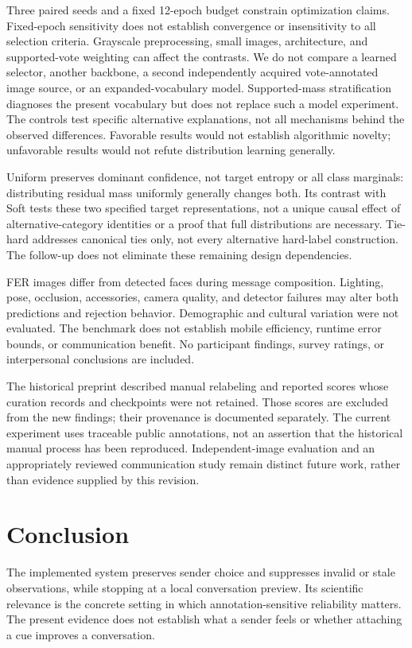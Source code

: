\documentclass[pdflatex,sn-mathphys-num]{sn-jnl}
\begin{document}
Three paired seeds and a fixed 12-epoch budget constrain optimization claims. Fixed-epoch sensitivity does not establish convergence or insensitivity to all selection criteria. Grayscale preprocessing, small images, architecture, and supported-vote weighting can affect the contrasts. We do not compare a learned selector, another backbone, a second independently acquired vote-annotated image source, or an expanded-vocabulary model. Supported-mass stratification diagnoses the present vocabulary but does not replace such a model experiment. The controls test specific alternative explanations, not all mechanisms behind the observed differences. Favorable results would not establish algorithmic novelty; unfavorable results would not refute distribution learning generally.

Uniform preserves dominant confidence, not target entropy or all class marginals: distributing residual mass uniformly generally changes both. Its contrast with Soft tests these two specified target representations, not a unique causal effect of alternative-category identities or a proof that full distributions are necessary. Tie-hard addresses canonical ties only, not every alternative hard-label construction. The follow-up does not eliminate these remaining design dependencies.

FER images differ from detected faces during message composition. Lighting, pose, occlusion, accessories, camera quality, and detector failures may alter both predictions and rejection behavior. Demographic and cultural variation were not evaluated. The benchmark does not establish mobile efficiency, runtime error bounds, or communication benefit. No participant findings, survey ratings, or interpersonal conclusions are included.

The historical preprint described manual relabeling and reported scores whose curation records and checkpoints were not retained. Those scores are excluded from the new findings; their provenance is documented separately. The current experiment uses traceable public annotations, not an assertion that the historical manual process has been reproduced. Independent-image evaluation and an appropriately reviewed communication study remain distinct future work, rather than evidence supplied by this revision.

\section{Conclusion}

The implemented system preserves sender choice and suppresses invalid or stale observations, while stopping at a local conversation preview. Its scientific relevance is the concrete setting in which annotation-sensitive reliability matters. The present evidence does not establish what a sender feels or whether attaching a cue improves a conversation.
\end{document}
